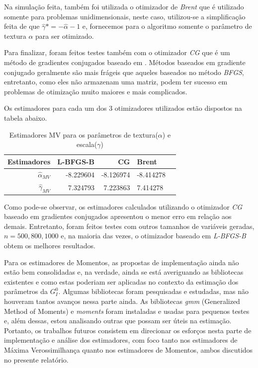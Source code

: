 \documentclass[12pt]{article}
\begin{document}
Na simulação feita, também foi utilizada o otimizador de \emph{Brent} que é utilizado somente para problemas unidimensionais, neste caso, utilizou-se a simplificação feita de que $\widehat{\gamma}* = -\widehat{\alpha} - 1$ e, fornecemos para o algoritmo somente o parâmetro de textura $\alpha$ para ser otimizado.

Para finalizar, foram feitos testes também com o otimizador \emph{CG} que é um método de gradientes conjugados baseado em \citet{Fletcher64}. Métodos baseados em gradiente conjugado geralmente são mais frágeis que aqueles baseados no método \emph{BFGS}, entretanto, como eles não armazenam uma matriz, podem ter sucesso em problemas de otimização muito maiores e mais complicados. 

Os estimadores para cada um dos 3 otimizadores utilizados estão dispostos na tabela abaixo.
\begin{table}[H]
\centering
\caption{Estimadores MV para os parâmetros de textura($\alpha$) e escala($\gamma$)}
\vspace{0.2cm}
\begin{tabular}{r|r|r|lr}
\hline
Estimadores & L-BFGS-B & CG & Brent \\ 
\hline                               
$\widehat{\alpha}_{MV}$ & -8.229604 & -8.126974 & -8.414278 \\
$\widehat{\gamma}_{MV}$ & 7.324793 & 7.223863 & 7.414278 \\
\end{tabular}
\end{table}

Como pode-se observar, os estimadores calculados utilizando o otimizador \emph{CG} baseado em gradientes conjugados apresentou o menor erro em relação aos demais. Entretanto, foram feitos testes com outros tamanhos de variáveis geradas, $n={500, 800, 1000}$ e, na maioria das vezes, o otimizador baseado em \emph{L-BFGS-B} obtem os melhores resultados.

Para os estimadores de Momentos, as propostas de implementação ainda não estão bem consolidadas e, na verdade, ainda se está averiguando as bibliotecas existentes e como estas poderiam ser aplicadas no contexto da estimação dos parâmetros da $G_I^0$. Algumas bibliotecas foram pesquisadas e estudadas, mas não houveram tantos avanços nessa parte ainda. As bibliotecas \textit{gmm} (Generalized Method of Moments) e \textit{moments} foram instaladas e usadas para pequenos testes e, além dessas, estou analisando outras que possam ser úteis na estimação. Portanto, os trabalhos futuros consistem em direcionar os esforços nesta parte de implementação e análise dos estimadores, com foco tanto nos estimadores de Máxima Verossimilhança quanto nos estimadores de Momentos, ambos discutidos no presente relatório. 

\newpage

%

%
\end{document}

